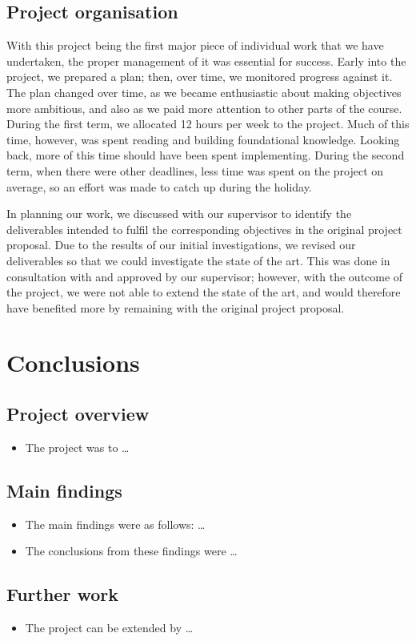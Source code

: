 \documentclass[12pt,a4paper]{article}
\begin{document}
\subsection{Project organisation}
With this project being the first major piece of individual work that we have undertaken, the proper management of it was essential for success. Early into the project, we prepared a plan; then, over time, we monitored progress against it. The plan changed over time, as we became enthusiastic about making objectives more ambitious, and also as we paid more attention to other parts of the course. During the first term, we allocated 12 hours per week to the project. Much of this time, however, was spent reading and building foundational knowledge. Looking back, more of this time should have been spent implementing. During the second term, when there were other deadlines, less time was spent on the project on average, so an effort was made to catch up during the holiday. 

In planning our work, we discussed with our supervisor to identify the deliverables intended to fulfil the corresponding objectives in the original project proposal. Due to the results of our initial investigations, we revised our deliverables so that we could investigate the state of the art. This was done in consultation with and approved by our supervisor; however, with the outcome of the project, we were not able to extend the state of the art, and would therefore have benefited more by remaining with the original project proposal. 

\newpage
\section{Conclusions}
\subsection{Project overview}
\begin{itemize}
    \item The project was to \dots
\end{itemize}

\subsection{Main findings}
\begin{itemize}
    \item The main findings were as follows: \dots
    \item The conclusions from these findings were \dots
\end{itemize}

\subsection{Further work}
\begin{itemize}
    \item The project can be extended by \dots
\end{itemize}

\newpage

\end{document}
